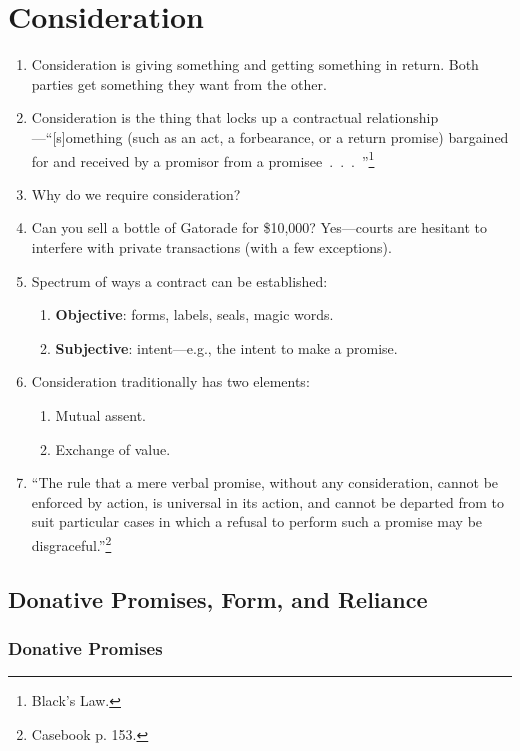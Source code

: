 \section{Consideration}

\begin{enumerate}
    \item Consideration is giving something and getting something in return. 
    Both parties get something they want from the other.
    \item Consideration is the thing that locks up a contractual 
    relationship---``[s]omething (such as an act, a forbearance, or a return 
    promise) bargained for and received by a promisor from a 
    promisee~.~.~.~''\footnote{Black's Law.}
    \item Why do we require consideration?
    \item Can you sell a bottle of Gatorade for \$10,000? Yes---courts are 
    hesitant to interfere with private transactions (with a few exceptions).
    \item Spectrum of ways a contract can be established:
    \begin{enumerate}
        \item \textbf{Objective}: forms, labels, seals, magic words.
        \item \textbf{Subjective}: intent---e.g., the intent to make a 
        promise.
    \end{enumerate}
    \item Consideration traditionally has two elements:
    \begin{enumerate}
        \item Mutual assent.
        \item Exchange of value.
    \end{enumerate}
    \item ``The rule that a mere verbal promise, without any consideration, 
    cannot be enforced by action, is universal in its action, and cannot be 
    departed from to suit particular cases in which a refusal to perform such 
    a promise may be disgraceful.''\footnote{Casebook p. 153.}
\end{enumerate}

\subsection{Donative Promises, Form, and Reliance}

\subsubsection{Donative Promises}

